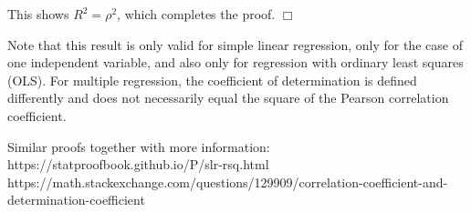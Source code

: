 {%
%
%

This shows $R^2 = \rho^2$, which completes the proof.
\hfill $\Box$ \\
\vspace*{-0.3cm}

Note that this result is only valid for simple linear regression, only for the case of one independent variable, and also only for regression with ordinary least squares (OLS). For multiple regression, the coefficient of determination is defined differently and does not necessarily equal the square of the Pearson correlation coefficient.

Similar proofs together with more information: \\
https://statproofbook.github.io/P/slr-rsq.html \\
https://math.stackexchange.com/questions/129909/correlation-coefficient-and-determination-coefficient

}
